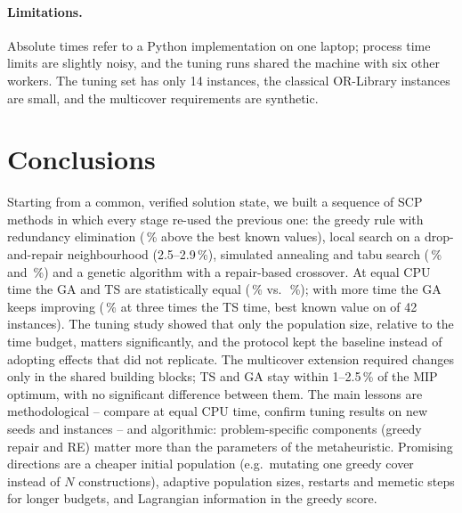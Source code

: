 \documentclass[11pt,a4paper]{article}
\begin{document}
\paragraph{Limitations.} Absolute times refer to a Python implementation on one laptop; process time limits are slightly noisy, and the tuning runs shared the machine with six other workers. The tuning set has only 14 instances, the classical OR-Library instances are small, and the multicover requirements are synthetic.

\section{Conclusions}\label{sec:conclusion}
Starting from a common, verified solution state, we built a sequence of SCP methods in which every stage re-used the previous one: the greedy rule with redundancy elimination (\devCHthreeRE\,\% above the best known values), local search on a drop-and-repair neighbourhood (2.5--2.9\,\%), simulated annealing and tabu search (\devSA\,\% and \devTS\,\%) and a genetic algorithm with a repair-based crossover.
At equal CPU time the GA and TS are statistically equal (\devGAshort\,\% vs.\ \devTS\,\%); with more time the GA keeps improving (\devGAlong\,\% at three times the TS time, best known value on \hitGAlong{} of 42 instances).
The tuning study showed that only the population size, relative to the time budget, matters significantly, and the protocol kept the baseline instead of adopting effects that did not replicate.
The multicover extension required changes only in the shared building blocks; TS and GA stay within 1--2.5\,\% of the MIP optimum, with no significant difference between them.
The main lessons are methodological -- compare at equal CPU time, confirm tuning results on new seeds and instances -- and algorithmic: problem-specific components (greedy repair and RE) matter more than the parameters of the metaheuristic.
Promising directions are a cheaper initial population (e.g.\ mutating one greedy cover instead of $N$ constructions), adaptive population sizes, restarts and memetic steps for longer budgets, and Lagrangian information in the greedy score.



\end{document}
